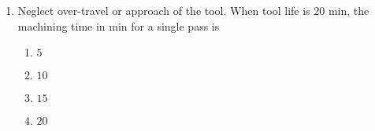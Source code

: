 \documentclass[journal,12pt,twocolumn]{IEEEtran}
\theoremstyle{remark}
\begin{document}
\begin{enumerate}[start=69]
                            \item Neglect over-travel or approach of the tool. When tool life is $20$ min, the machining time in min for a single pass is
                            \begin{enumerate}
                               \item  $5$
                                \item $10$ 
                                \item $15$ 
                                \item $20$
                            \end{enumerate}
                        \end{enumerate}
                        
\end{document}
